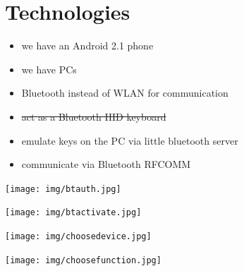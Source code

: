 \documentclass[ddc nogerman]{tudbeamer}
\begin{document}
\section{Technologies}
\begin{frame}
    \begin{itemize}
        \item we have an Android 2.1 phone
        \item we have PCs
        \item Bluetooth instead of WLAN for communication
        \item\sout{act as a Bluetooth HID keyboard}
        \item emulate keys on the PC via little bluetooth server
        \item communicate via Bluetooth RFCOMM
    \end{itemize}
\end{frame}

\begin{frame}
    \texttt{[image: img/btauth.jpg]}
\end{frame}

\begin{frame}
    \texttt{[image: img/btactivate.jpg]}
\end{frame}

\begin{frame}
    \texttt{[image: img/choosedevice.jpg]}
\end{frame}

\begin{frame}
    \texttt{[image: img/choosefunction.jpg]}
\end{frame}
\end{document}
